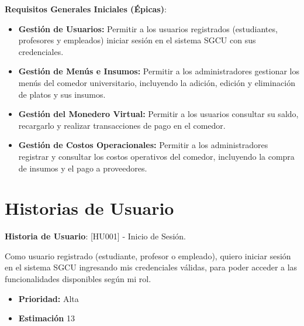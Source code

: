 \documentclass[12pt]{article}
\begin{document}
\textbf{Requisitos Generales Iniciales (Épicas)}:
\begin{itemize}
	\item \textbf{Gestión de Usuarios:} Permitir a los usuarios registrados (estudiantes, profesores y empleados) iniciar sesión en el sistema SGCU con sus credenciales.
	\item \textbf{Gestión de Menús e Insumos:} Permitir a los administradores gestionar los menús del comedor universitario, incluyendo la adición, edición y eliminación de platos y sus insumos.
	\item \textbf{Gestión del Monedero Virtual:} Permitir a los usuarios consultar su saldo, recargarlo y realizar transacciones de pago en el comedor.
	\item \textbf{Gestión de Costos Operacionales:} Permitir a los administradores registrar y consultar los costos operativos del comedor, incluyendo la compra de insumos y el pago a proveedores.
\end{itemize}

\pagebreak

\section{Historias de Usuario}

\textbf{Historia de Usuario}: [HU001] - Inicio de Sesión.

Como usuario registrado (estudiante, profesor o empleado), quiero iniciar sesión en el sistema SGCU ingresando mis credenciales válidas, para poder acceder a las funcionalidades disponibles según mi rol.

\begin{itemize}
	\item \textbf{Prioridad:} Alta
	\item \textbf{Estimación} 13
\end{itemize}
\end{document}
